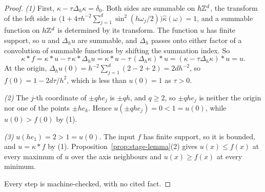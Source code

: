 \begin{proof}
\emph{(1)} First, $\kappa - \tau\Delta_h\kappa = \delta_0$. Both sides are summable on $h\mathbb{Z}^d$,
the transform of the left side is
$\bigl(1 + 4\tau h^{-2}\sum_{j=1}^d\sin^2(h\omega_j/2)\bigr)\widehat\kappa(\omega) = 1$, and a
summable function on $h\mathbb{Z}^d$ is determined by its transform. The function $u$ has finite support, so $u$ and
$\Delta_hu$ are summable, and $\Delta_h$ passes onto either factor of a convolution of summable
functions by shifting the summation index. So
\[
\kappa * f = \kappa * u - \tau\,\kappa * \Delta_hu = \kappa * u - \tau\,(\Delta_h\kappa) * u
= (\kappa - \tau\Delta_h\kappa) * u = u .
\]
At the origin, $\Delta_hu(0) = h^{-2}\sum_{j=1}^d(2 - 2 + 2) = 2dh^{-2}$, so
$f(0) = 1 - 2d\tau/h^2$, which is less than $u(0) = 1$ as $\tau > 0$.

\emph{(2)} The $j$-th coordinate of $\pm qhe_j$ is $\pm qh$, and $q \ge 2$, so $\pm qhe_j$ is neither
the origin nor one of the points $\pm he_k$. Hence $u(\pm qhe_j) = 0 < 1 = u(0)$, while
$u(0) > f(0)$ by (1).

\emph{(3)} $u(he_1) = 2 > 1 = u(0)$. The input $f$ has finite support, so it is bounded, and
$u = \kappa * f$ by (1). Proposition~\ref{prop:stage-lemma}(2) gives $u(x) \le f(x)$ at every
maximum of $u$ over the axis neighbours and $u(x) \ge f(x)$ at every minimum.

Every step is machine-checked, with no cited fact.
\end{proof}

